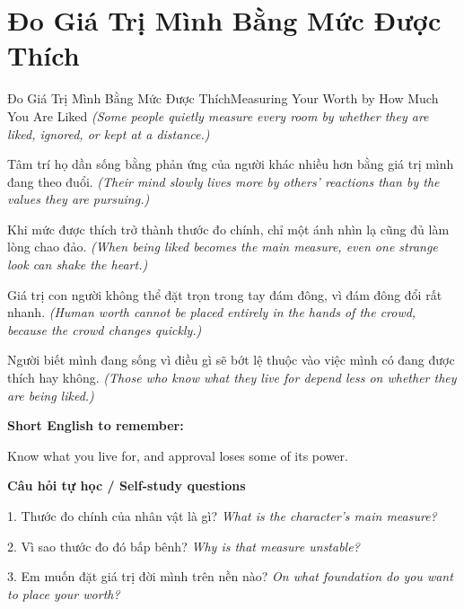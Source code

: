 \section{Đo Giá Trị Mình Bằng Mức Được Thích}
\begin{truyen}{Đo Giá Trị Mình Bằng Mức Được Thích}{Measuring Your Worth by How Much You Are Liked}
\textit{(Some people quietly measure every room by whether they are liked, ignored, or kept at a distance.)}

Tâm trí họ dần sống bằng phản ứng của người khác nhiều hơn bằng giá trị mình đang theo đuổi.
\textit{(Their mind slowly lives more by others' reactions than by the values they are pursuing.)}

Khi mức được thích trở thành thước đo chính, chỉ một ánh nhìn lạ cũng đủ làm lòng chao đảo.
\textit{(When being liked becomes the main measure, even one strange look can shake the heart.)}

Giá trị con người không thể đặt trọn trong tay đám đông, vì đám đông đổi rất nhanh.
\textit{(Human worth cannot be placed entirely in the hands of the crowd, because the crowd changes quickly.)}

\end{truyen}

\begin{baihoc}
Người biết mình đang sống vì điều gì sẽ bớt lệ thuộc vào việc mình có đang được thích hay không.
\textit{(Those who know what they live for depend less on whether they are being liked.)}
\end{baihoc}

\begin{ghinhoanh}
\textbf{Short English to remember:}

Know what you live for, and approval loses some of its power.

\end{ghinhoanh}

\begin{tuhocnhanh}
\textbf{Câu hỏi tự học / Self-study questions}

1. Thước đo chính của nhân vật là gì? \textit{What is the character's main measure?}

2. Vì sao thước đo đó bấp bênh? \textit{Why is that measure unstable?}

3. Em muốn đặt giá trị đời mình trên nền nào? \textit{On what foundation do you want to place your worth?}
\end{tuhocnhanh}
